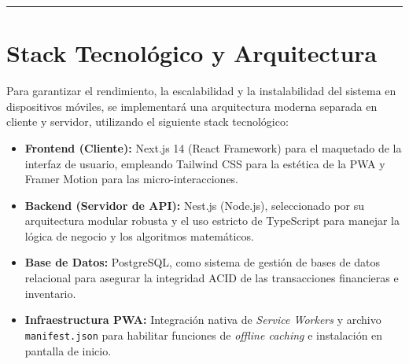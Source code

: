 \documentclass[11pt, letterpaper]{article}
\begin{document}
    \setcounter{page}{2} %
   
    \begin{abstract}
        Este documento detalla la transformación de las Historias de Usuario (negocio) que conforman el núcleo de la plataforma TienditaCampus en especificaciones técnicas y tareas de desarrollo (ingeniería), cubriendo el ciclo completo desde la autenticación hasta la analítica financiera y la configuración PWA.
    \end{abstract}
   
    \hrule
    \vspace{1.5em}

    \section{Stack Tecnológico y Arquitectura}
    
    Para garantizar el rendimiento, la escalabilidad y la instalabilidad del sistema en dispositivos móviles, se implementará una arquitectura moderna separada en cliente y servidor, utilizando el siguiente stack tecnológico:
    
    \begin{itemize}
        \item \textbf{Frontend (Cliente):} Next.js 14 (React Framework) para el maquetado de la interfaz de usuario, empleando Tailwind CSS para la estética de la PWA y Framer Motion para las micro-interacciones.
        \item \textbf{Backend (Servidor de API):} Nest.js (Node.js), seleccionado por su arquitectura modular robusta y el uso estricto de TypeScript para manejar la lógica de negocio y los algoritmos matemáticos.
        \item \textbf{Base de Datos:} PostgreSQL, como sistema de gestión de bases de datos relacional para asegurar la integridad ACID de las transacciones financieras e inventario.
        \item \textbf{Infraestructura PWA:} Integración nativa de \textit{Service Workers} y archivo \texttt{manifest.json} para habilitar funciones de \textit{offline caching} e instalación en pantalla de inicio.
    \end{itemize}
\end{document}

